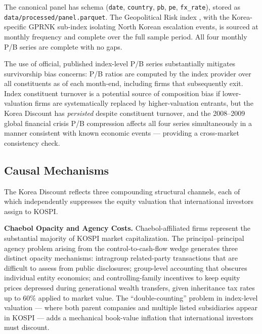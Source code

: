 \documentclass[12pt]{article}
\begin{document}
The canonical panel has schema (\texttt{date}, \texttt{country}, \texttt{pb}, \texttt{pe},
\texttt{fx\_rate}), stored as \texttt{data/processed/panel.parquet}. The Geopolitical Risk index
\citep{caldara2022}, with the Korea-specific GPRNK sub-index \citep{imf2021} isolating North
Korean escalation events, is sourced at monthly frequency and complete over the full sample
period. All four monthly P/B series are complete with no gaps.

The use of official, published index-level P/B series substantially mitigates survivorship
bias concerns: P/B ratios are computed by the index provider over all constituents as of
each month-end, including firms that subsequently exit. Index constituent turnover is a
potential source of composition bias if lower-valuation firms are systematically replaced
by higher-valuation entrants, but the Korea Discount has \textit{persisted} despite constituent
turnover, and the 2008--2009 global financial crisis P/B compression affects all four series
simultaneously in a manner consistent with known economic events --- providing a cross-market
consistency check.




\subsection{Causal Mechanisms}

The Korea Discount reflects three compounding structural channels, each of which independently
suppresses the equity valuation that international investors assign to KOSPI.

\textbf{Chaebol Opacity and Agency Costs.} Chaebol-affiliated firms represent the substantial
majority of KOSPI market capitalization. The principal--principal agency problem arising from
the control-to-cash-flow wedge generates three distinct opacity mechanisms: intragroup
related-party transactions that are difficult to assess from public disclosures; group-level
accounting that obscures individual entity economics; and controlling-family incentives to
keep equity prices depressed during generational wealth transfers, given inheritance tax rates
up to 60\% applied to market value. The ``double-counting'' problem in index-level valuation
--- where both parent companies and multiple listed subsidiaries appear in KOSPI --- adds a
mechanical book-value inflation that international investors must discount.
\end{document}
